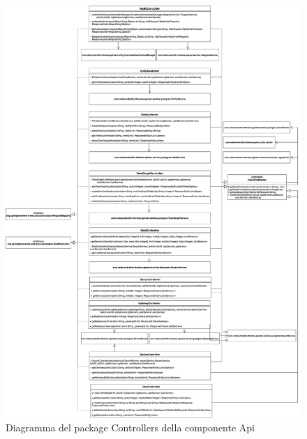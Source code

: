 		\begin{figure}[H]
			\centering
			\includegraphics[scale=0.300]{res/images/API/Controllers.png}
			\caption{Diagramma del package Controllers della componente Api}
		\end{figure}
